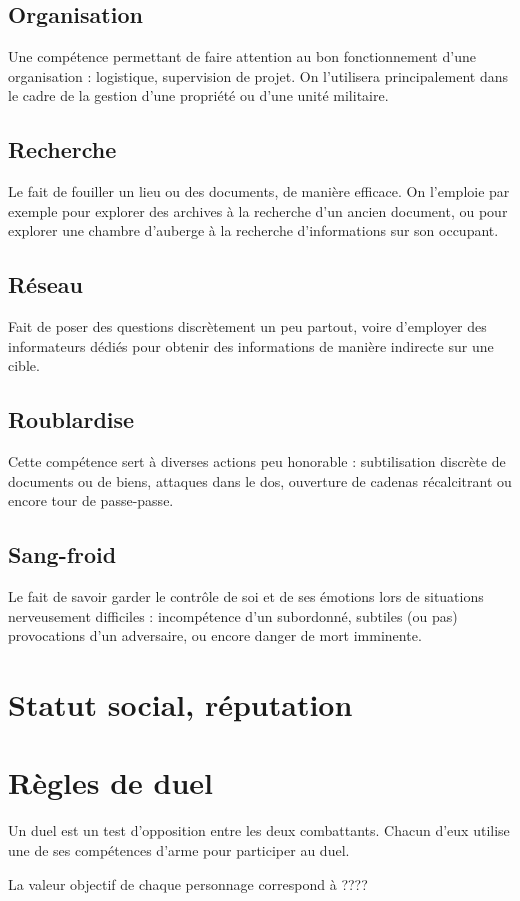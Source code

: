 \documentclass[10pt,a4paper]{book}
\begin{document}
\subsection*{Organisation} Une compétence permettant de faire attention au bon fonctionnement d'une organisation : logistique, supervision de projet. On l'utilisera principalement dans le cadre de la gestion d'une propriété ou d'une unité militaire.
\subsection*{Recherche}Le fait de fouiller un lieu ou des documents, de manière efficace. On l'emploie par exemple pour explorer des archives à la recherche d'un ancien document, ou pour explorer une chambre d'auberge à la recherche d'informations sur son occupant.
\subsection*{Réseau} Fait de poser des questions discrètement un peu partout, voire d'employer des informateurs dédiés pour obtenir des informations de manière indirecte sur une cible. 
\subsection*{Roublardise} Cette compétence sert à diverses actions peu honorable : subtilisation discrète de documents ou de biens, attaques dans le dos, ouverture de cadenas récalcitrant ou encore tour de passe-passe.
\subsection*{Sang-froid} Le fait de savoir garder le contrôle de soi et de ses émotions lors de situations nerveusement difficiles : incompétence d'un subordonné, subtiles (ou pas) provocations d'un adversaire, ou encore danger de mort imminente.
\section{Statut social, réputation}
\section{Règles de duel}
Un duel est un test d'opposition entre les deux combattants. Chacun d'eux utilise une de ses compétences d'arme pour participer au duel. 

La valeur objectif de chaque personnage correspond à ????
\end{document}
